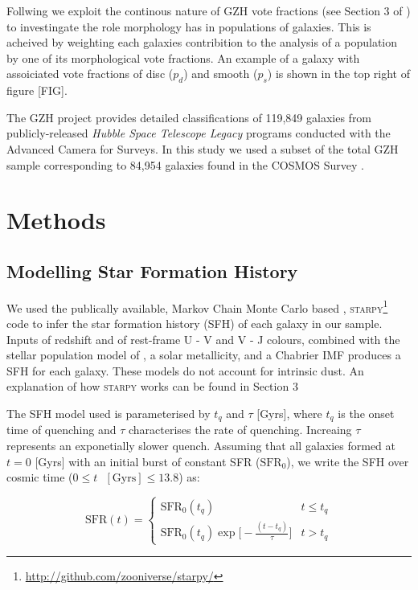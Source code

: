 \documentclass[a4paper,fleqn,usenatbib]{mnras}
\begin{document}
   Follwing \cite{smethurst2015galaxy} we exploit the continous nature of GZH vote fractions (see Section 3 of
   \cite{galaxyzooHubble}) to investingate the role morphology has in populations of galaxies. This is acheived by weighting
   each galaxies contribition to the analysis of a population by one of its morphological vote fractions. An example of a galaxy
   with assoiciated vote fractions of disc ($p_{d}$) and smooth ($p_{s}$) is shown in the top right of figure [FIG].

   The GZH project provides detailed classifications of 119,849 galaxies from publicly-released \textit{Hubble
   Space Telescope Legacy} programs conducted with the Advanced Camera for Surveys. In this study we used a subset of the total GZH sample corresponding to 84,954
   galaxies found in the COSMOS Survey \citep{scoville2007,koekemoer2007}.

\section{Methods}   

   \subsection{Modelling Star Formation History}

   We used the publically available, Markov Chain Monte Carlo based \citep{mackey2013},
   \textsc{starpy}\footnote{\url{http://github.com/zooniverse/starpy/}} code to infer the star formation 
   history (SFH) of each galaxy in our sample. Inputs of redshift and of rest-frame U - V and V - J colours, 
   combined with the stellar population model of \cite{bruzual2003}, a solar metallicity, and a Chabrier IMF 
   \cite{chabrier2003} produces a SFH for each galaxy. These models do not account for intrinsic dust. An 
   explanation of how \textsc{starpy} works can be found in Section 3

   The SFH model used is parameterised by $t_{q}$ and $\tau$ [Gyrs], where $t_{q}$ is the onset time of quenching
   and $\tau$ characterises the rate of quenching. Increaing $\tau$ represents an exponetially slower quench. 
   Assuming that all galaxies formed at $t=0$ [Gyrs] with an initial burst of constant SFR ($\text{SFR}_{0}$), 
   we write the SFH over cosmic time ($0\leq t \text{ }[\text{Gyrs}]\leq 13.8$) as:

 \begin{equation}
       \text{SFR}(t) = \begin{cases}
                 \text{SFR}_{0}(t_{q}) & t \leq t_{q} \\
                 \text{SFR}_{0}(t_{q})\exp\bigg[-\frac{(t-t_{q})}{\tau}\bigg] & t > t_{q} 
                \end{cases}
        \label{eq:model}
 \end{equation}
\end{document}
